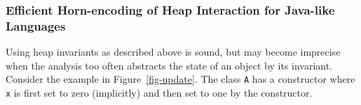 \newcommand{\true}{\ensuremath{\mathsf{true}}\xspace}
\newcommand{\false}{\ensuremath{\mathsf{false}}\xspace}

\newcommand{\smallpar}[1]{\medskip\noindent\emph{#1}:}

\newcommand{\expr}{\ensuremath{\textit{t}}\xspace}
\newcommand{\lvar}{\ensuremath{\textit{x}}\xspace}
\newcommand{\lvarp}{\ensuremath{\textit{y}}\xspace}
\newcommand{\pvar}{\ensuremath{\textit{p}}\xspace}
\newcommand{\qvar}{\ensuremath{\textit{q}}\xspace}
\newcommand{\cvar}{\ensuremath{\textit{c}}\xspace}

\newcommand{\fvar}{\ensuremath{\textit{f}}\xspace}

\newtheorem{theorem}{Theorem}[section]
\newtheorem{lemma}[theorem]{Lemma}





\subsubsection{Efficient Horn-encoding of Heap Interaction for Java-like Languages}
Using heap invariants as described above is sound, but may become imprecise 
when the analysis too often abstracts the state of an object by its invariant.
Consider the example in Figure~\ref{fig-update}. The class \texttt{A} has a 
constructor where \texttt{x} is first set to zero (implicitly) and then
set to one by the constructor. 


